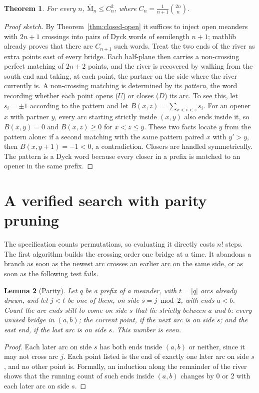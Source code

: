 \documentclass[11pt]{amsart}
\newtheorem{theorem}{Theorem}[section]
\newtheorem{lemma}[theorem]{Lemma}
\theoremstyle{definition}
\theoremstyle{remark}
\newcommand{\Closed}{\overline{\mathrm{M}}}
\begin{document}
\begin{theorem}\label{thm:catalan}
For every $n$, $\Closed_n \le C_n^2$, where $C_n = \frac{1}{n+1}\binom{2n}{n}$.
\end{theorem}
\begin{proof}[Proof sketch]
By Theorem~\ref{thm:closed-open} it suffices to inject open meanders with $2n+1$ crossings into
pairs of Dyck words of semilength $n+1$; mathlib already proves that there are $C_{n+1}$ such
words. Treat the two ends of the river as extra points east of every bridge. Each half-plane
then carries a non-crossing perfect matching of $2n+2$ points, and the river is recovered by
walking from the south end and taking, at each point, the partner on the side where the river
currently is. A non-crossing matching is determined by its \emph{pattern}, the word recording
whether each point opens ($U$) or closes ($D$) its arc. To see this, let $s_i = \pm 1$ according
to the pattern and let $B(x,z) = \sum_{x<i<z} s_i$. For an opener $x$ with partner $y$, every
arc starting strictly inside $(x,y)$ also ends inside it, so $B(x,y) = 0$ and $B(x,z) \ge 0$
for $x < z \le y$. These two facts locate $y$ from the pattern alone: if a second matching with
the same pattern paired $x$ with $y' > y$, then $B(x,y+1) = -1 < 0$, a contradiction. Closers
are handled symmetrically. The pattern is a Dyck word because every closer in a prefix is
matched to an opener in the same prefix.
\end{proof}

\section{A verified search with parity pruning}\label{sec:search}

The specification counts permutations, so evaluating it directly costs $n!$ steps. The first
algorithm builds the crossing order one bridge at a time. It abandons a branch as soon as the
newest arc crosses an earlier arc on the same side, or as soon as the following test fails.

\begin{lemma}[Parity]\label{lem:parity}
Let $q$ be a prefix of a meander, with $t = |q|$ arcs already drawn, and let $j < t$ be one of
them, on side $s = j \bmod 2$, with ends $a<b$. Count the arc ends still to come on side $s$
that lie strictly between $a$ and $b$: every unused bridge in $(a,b)$; the current point, if
the next arc is on side $s$; and the east end, if the last arc is on side $s$. This number is
even.
\end{lemma}
\begin{proof}
Each later arc on side $s$ has both ends inside $(a,b)$ or neither, since it may not cross
arc $j$. Each point listed is the end of exactly one later arc on side $s$, and no other point
is. Formally, an induction along the remainder of the river shows that the running count of
such ends inside $(a,b)$ changes by $0$ or $2$ with each later arc on side $s$.
\end{proof}
\end{document}

